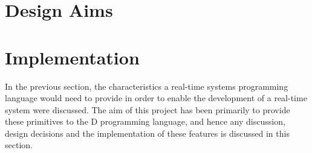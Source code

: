 








\section{Design Aims}



\section{Implementation}

In the previous section, the characteristics a real-time 
systems programming language would need to provide in order to enable the 
development of a real-time system were discussed. The aim of this project has been primarily to 
provide these primitives to the D programming language, and hence any discussion, 
design decisions and the implementation of these features is discussed in this 
section. 

